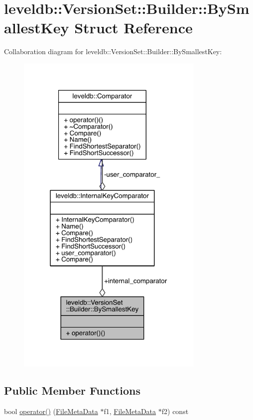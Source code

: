 \hypertarget{structleveldb_1_1_version_set_1_1_builder_1_1_by_smallest_key}{}\section{leveldb\+:\+:Version\+Set\+:\+:Builder\+:\+:By\+Smallest\+Key Struct Reference}
\label{structleveldb_1_1_version_set_1_1_builder_1_1_by_smallest_key}


Collaboration diagram for leveldb\+:\+:Version\+Set\+:\+:Builder\+:\+:By\+Smallest\+Key\+:\nopagebreak
\begin{figure}[H]
\begin{center}
\leavevmode
\includegraphics[width=256pt]{structleveldb_1_1_version_set_1_1_builder_1_1_by_smallest_key__coll__graph}
\end{center}
\end{figure}
\subsection*{Public Member Functions}
\begin{DoxyCompactItemize}
\item 
bool \hyperlink{structleveldb_1_1_version_set_1_1_builder_1_1_by_smallest_key_ad3a45d378ebdf0c16d26a881c4435344}{operator()} (\hyperlink{structleveldb_1_1_file_meta_data}{File\+Meta\+Data} $\ast$f1, \hyperlink{structleveldb_1_1_file_meta_data}{File\+Meta\+Data} $\ast$f2) const 
\end{DoxyCompactItemize}
